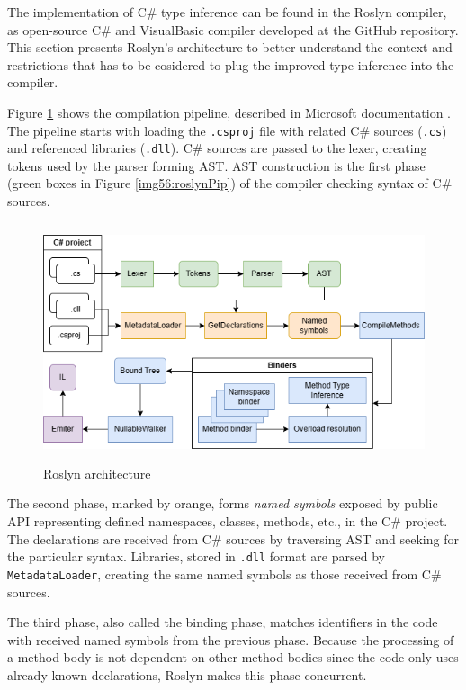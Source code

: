 The implementation of C\# type inference can be found in the Roslyn compiler, as open-source C\# and VisualBasic compiler developed at the GitHub repository. 
This section presents Roslyn’s architecture to better understand the context and restrictions that has to be cosidered to plug the improved type inference into the compiler.
\par
Figure \ref{img15:roslynPip} shows the compilation pipeline, described in Microsoft documentation \cite{online:roslynArchitecture}.
The pipeline starts with loading the \texttt{.csproj} file with related C\# sources (\texttt{.cs}) and referenced libraries (\texttt{.dll}).
C\# sources are passed to the lexer, creating tokens used by the parser forming \ac{AST}.
\ac{AST} construction is the first phase (green boxes in Figure \ref{img56:roslynPip}) of the compiler checking syntax of C\# sources.
\begin{figure}[h]
\centering
\includegraphics[width=120mm, height=70mm]{./img/Roslyn_Arch.png}
\caption{Roslyn architecture}
\label{img15:roslynPip}
\end{figure}
\par
The second phase, marked by orange, forms \emph{named symbols} exposed by public API representing defined namespaces, classes, methods, etc., in the C\# project. 
The declarations are received from C\# sources by traversing AST and seeking for the particular syntax. Libraries, stored in \texttt{.dll} format are parsed by \texttt{MetadataLoader}, creating the same named symbols as those received from C\# sources.
\par
The third phase, also called the binding phase, matches identifiers in the code with received named symbols from the previous phase. 
Because the processing of a method body is not dependent on other method bodies since the code only uses already known declarations, Roslyn makes this phase concurrent. 
